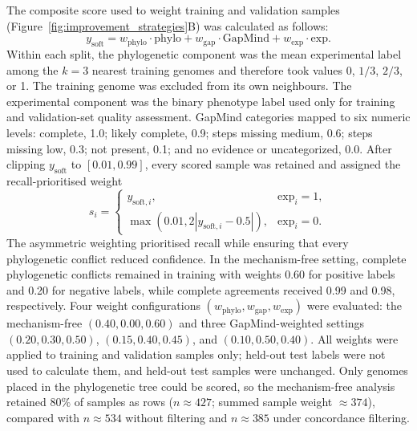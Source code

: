 The composite score used to weight training and validation samples (Figure~\ref{fig:improvement_strategies}B) was calculated as follows:
\begin{equation*}
    y_{\mathrm{soft}} = w_{\mathrm{phylo}} \cdot \mathrm{phylo} + w_{\mathrm{gap}} \cdot \mathrm{GapMind} + w_{\mathrm{exp}} \cdot \mathrm{exp}.
\end{equation*}
Within each split, the phylogenetic component was the mean experimental label among the $k=3$ nearest training genomes and therefore took values 0, $1/3$, $2/3$, or 1.
The training genome was excluded from its own neighbours.
The experimental component was the binary phenotype label used only for training and validation-set quality assessment.
GapMind categories mapped to six numeric levels: complete, 1.0; likely complete, 0.9; steps missing medium, 0.6; steps missing low, 0.3; not present, 0.1; and no evidence or uncategorized, 0.0.
After clipping $y_{\mathrm{soft}}$ to $[0.01,0.99]$, every scored sample was retained and assigned the recall-prioritised weight
\begin{equation*}
    s_i =
    \begin{cases}
        y_{\mathrm{soft},i}, & \mathrm{exp}_i = 1,\\
        \max\left(0.01, 2\left|y_{\mathrm{soft},i}-0.5\right|\right), & \mathrm{exp}_i = 0.
    \end{cases}
\end{equation*}
The asymmetric weighting prioritised recall while ensuring that every phylogenetic conflict reduced confidence.
In the mechanism-free setting, complete phylogenetic conflicts remained in training with weights 0.60 for positive labels and 0.20 for negative labels, while complete agreements received 0.99 and 0.98, respectively.
Four weight configurations $(w_{\mathrm{phylo}}, w_{\mathrm{gap}}, w_{\mathrm{exp}})$ were evaluated: the mechanism-free $(0.40, 0.00, 0.60)$ and three GapMind-weighted settings $(0.20, 0.30, 0.50)$, $(0.15, 0.40, 0.45)$, and $(0.10, 0.50, 0.40)$.
All weights were applied to training and validation samples only; held-out test labels were not used to calculate them, and held-out test samples were unchanged.
Only genomes placed in the phylogenetic tree could be scored, so the mechanism-free analysis retained $80\%$ of samples as rows ($n\approx 427$; summed sample weight $\approx374$), compared with $n\approx 534$ without filtering and $n\approx385$ under concordance filtering.

